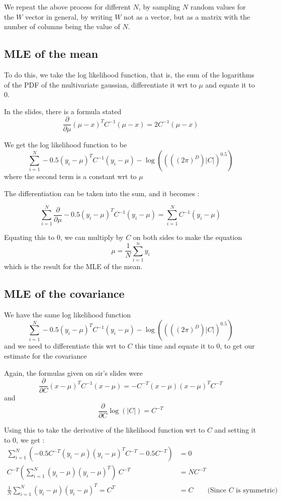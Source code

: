 \documentclass{article}
\begin{document}
We repeat the above process for different $N$, by sampling $N$ random values for the $W$ vector in general, by writing $W$ not as a vector, but as a matrix with the number of columns being the value of $N$.

\subsection{MLE of the mean}

To do this, we take the log likelihood function, that is, the sum of the logarithms of the PDF of the multivariate gaussian, differentiate it wrt to $\mu$ and equate it to 0. 

In the slides, there is a formula stated \[ \frac{\partial }{\partial \mu} (\mu - x)^TC^{-1}(\mu - x) = 2C^{-1}(\mu - x) \]

We get the log likelihood function to be \[ \sum_{i=1}^N -0.5(y_i - \mu)^TC^{-1}(y_i-\mu) - \log((((2\pi)^D)|C|)^{0.5})  \] where the second term is a constant wrt to $\mu$

The differentiation can be taken into the sum, and it becomes : 

\[ \sum_{i=1}^N \frac{\partial }{\partial \mu}-0.5(y_i - \mu)^TC^{-1}(y_i-\mu) = \sum_{i=1}^N C^{-1}(y_i-\mu)  \]

Equating this to 0, we can multiply by $C$ on both sides to make the equation \[ \mu = \frac{1}{N}\sum_{i=1}^n y_i \] which is the result for the MLE of the mean.

\subsection{MLE of the covariance}

We have the same log likelihood function \[ \sum_{i=1}^N -0.5(y_i - \mu)^TC^{-1}(y_i-\mu) - \log((((2\pi)^D)|C|)^{0.5})  \] and we need to differentiate this wrt to $C$ this time and equate it to 0, to get our estimate for the covariance

Again, the formulas given on sir's slides were \[ \frac{\partial }{\partial C} (x - \mu)^TC^{-1}(x - \mu) = -C^{-T}(x - \mu)(x-\mu)^TC^{-T} \] and \[ \frac{\partial }{\partial C} \log(|C|) = C^{-T} \]

Using this to take the derivative of the likelihood function wrt to $C$ and setting it to 0, we get : 
 \begin{align*}
     \sum_{i=1}^N \left(-0.5 C^{-T}(y_i- \mu) (y_i-\mu)^TC^{-T} - 0.5C^{-T}\right) &= 0 \\
     C^{-T} \left(\sum_{i=1}^N (y_i- \mu) (y_i-\mu)^T\right) \: C^{-T} &= N C^{-T} \\
     \frac{1}{N}\sum_{i=1}^N (y_i- \mu) (y_i-\mu)^T = C^T &= C \qquad \text{(Since $C$ is symmetric)}
 \end{align*}
 
\end{document}
